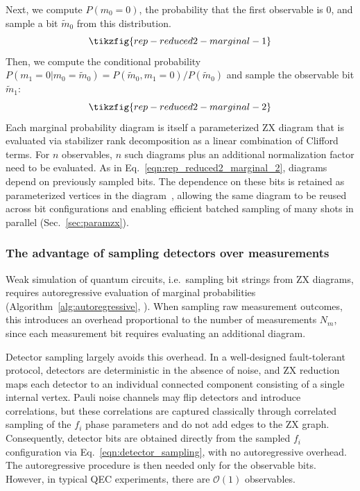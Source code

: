 \documentclass[
  a4paper,
  onecolumn,
  11pt,
  allowtoday
]{quantumarticle}
\newcommand{\bigO}[1]{\mathcal{O}(#1)}
\begin{document}
Next, we compute $P(m_0=0)$, the probability that the first observable is 0, and sample a bit $\tilde{m}_0$ from this distribution.
\begin{equation}
  \tikzfig{rep-reduced2-marginal-1}
\end{equation}
Then, we compute the conditional probability $P(m_1=0 | m_0=\tilde{m}_0) = P(\tilde{m}_0, m_1=0) / P(\tilde{m}_0)$ and sample the observable bit $\tilde{m}_1$:
\begin{equation}
  \tikzfig{rep-reduced2-marginal-2}
  \label{eqn:rep_reduced2_marginal_2}
\end{equation}
Each marginal probability diagram is itself a parameterized ZX diagram that is evaluated via stabilizer rank decomposition as a linear combination of Clifford terms. For $n$ observables, $n$ such diagrams plus an additional normalization factor need to be evaluated. As in Eq.~\eqref{eqn:rep_reduced2_marginal_2}, diagrams depend on previously sampled bits. The dependence on these bits is retained as parameterized vertices in the diagram~\cite{Sutcliffe_2025,sutcliffe2025novel}, allowing the same diagram to be reused across bit configurations and enabling efficient batched sampling of many shots in parallel (Sec.~\ref{sec:paramzx}).

\subsubsection{The advantage of sampling detectors over measurements}
\label{sec:detector_advantage}

Weak simulation of quantum circuits, i.e.\ sampling bit strings from ZX diagrams, requires autoregressive evaluation of marginal probabilities (Algorithm~\ref{alg:autoregressive}, \cite{kissinger2022simulating}). When sampling raw measurement outcomes, this introduces an overhead proportional to the number of measurements $N_m$, since each measurement bit requires evaluating an additional diagram.

Detector sampling largely avoids this overhead. In a well-designed fault-tolerant protocol, detectors are deterministic in the absence of noise, and ZX reduction maps each detector to an individual connected component consisting of a single internal vertex. Pauli noise channels may flip detectors and introduce correlations, but these correlations are captured classically through correlated sampling of the $f_i$ phase parameters and do not add edges to the ZX graph. Consequently, detector bits are obtained directly from the sampled $f_i$ configuration via Eq.~\eqref{eqn:detector_sampling}, with no autoregressive overhead.
The autoregressive procedure is then needed only for the observable bits. However, in typical QEC experiments, there are $\bigO{1}$ observables.
\end{document}

